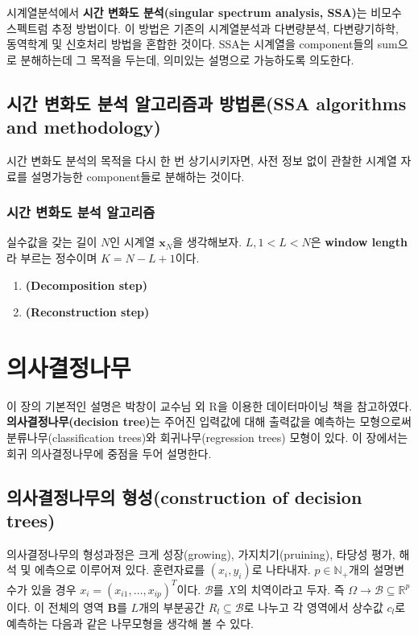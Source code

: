 \documentclass[b5paper,]{scrbook}
\theoremstyle{plain}
\theoremstyle{definition}
\numberwithin{equation}{section}
\begin{document}
시계열분석에서 \textbf{시간 변화도 분석(singular spectrum analysis,
SSA)}는 비모수 스펙트럼 추정 방법이다. 이 방법은 기존의 시계열분석과
다변량분석, 다변량기하학, 동역학계 및 신호처리 방법을 혼합한 것이다.
SSA는 시계열을 component들의 sum으로 분해하는데 그 목적을 두는데,
의미있는 설명으로 가능하도록 의도한다.

\section{시간 변화도 분석 알고리즘과 방법론(SSA algorithms and
methodology)}\label{----ssa-algorithms-and-methodology}

시간 변화도 분석의 목적을 다시 한 번 상기시키자면, 사전 정보 없이 관찰한
시계열 자료를 설명가능한 component들로 분해하는 것이다.

\subsection{시간 변화도 분석 알고리즘}\label{---}

실수값을 갖는 길이 \(N\)인 시계열 \(\mathbf{x}_{N}\)을 생각해보자.
\(L, 1<L<N\)은 \textbf{window length}라 부르는 정수이며 \(K=N-L+1\)이다.

\begin{enumerate}
\def\labelenumi{\arabic{enumi}.}
\item
  \textbf{(Decomposition step)}
\item
  \textbf{(Reconstruction step)}
\end{enumerate}

\chapter{의사결정나무}\label{trees}

이 장의 기본적인 설명은 박창이 교수님 외 R을 이용한 데이터마이닝 책을
참고하였다. \textbf{의사결정나무(decision tree)}는 주어진 입력값에 대해
출력값을 예측하는 모형으로써 분류나무(classification trees)와
회귀나무(regression trees) 모형이 있다. 이 장에서는 회귀 의사결정나무에
중점을 두어 설명한다.

\section{의사결정나무의 형성(construction of decision
trees)}\label{-construction-of-decision-trees}

의사결정나무의 형성과정은 크게 성장(growing), 가지치기(pruining), 타당성
평가, 해석 및 에측으로 이루어져 있다. 훈련자료를 \((x_{i}, y_{i})\)로
나타내자. \(p \in \mathbb{N}_{+}\)개의 설명변수가 있을 경우
\(x_{i}=(x_{i1}, \ldots, x_{ip})^{T}\)이다. \(\mathcal{B}\)를 \(X\)의
치역이라고 두자. 즉
\(\Omega \rightarrow \mathcal{B} \subseteq \mathbb{R}^{p}\)이다. 이
전체의 영역 \(\mathbf{B}\)를 \(L\)개의 부분공간
\(R_{l}\subseteq \mathcal{B}\)로 나누고 각 영역에서 상수값 \(c_{l}\)로
예측하는 다음과 같은 나무모형을 생각해 볼 수 있다.
\end{document}
